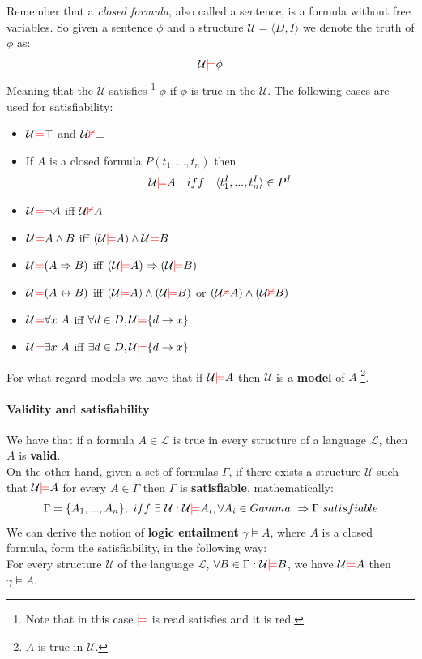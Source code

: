 \documentclass[10pt,a4paper]{article}
\begin{document}
Remember that a \textit{closed formula}, also called a sentence, is a formula without free variables. So given a sentence $\phi$ and a structure $\mathcal{U}=\langle D, I \rangle$ we denote the truth of $\phi$ as:
\[\mathcal{U} \textcolor{red}{\models} \phi\]
Meaning that the $\mathcal{U}$ satisfies \footnote{Note that in this case $\textcolor{red}{\models}$ is read satisfies and it is red.} $\phi$ if $\phi$ is true in the $\mathcal{U}$. The following cases are used for satisfiability:
\begin{itemize}
\item $\mathcal{U}\textcolor{red}{\models} \top$ and $\mathcal{U} \textcolor{red}{\nvDash} \bot$
\item If $A$ is a closed formula $P(t_1,...,t_n)$ then
\[\mathcal{U} \textcolor{red}{\models} A\quad iff\quad \langle t_1^I,...,t_n^I\rangle \in P^I\]
\item $\mathcal{U} \textcolor{red}{\models} \neg A$ iff $\mathcal{U} \textcolor{red}{\nvDash} A$
\item $\mathcal{U} \textcolor{red}{\models} A \wedge B$ iff $(\mathcal{U} \textcolor{red}{\models} A)\wedge \mathcal{U} \textcolor{red}{\models} B$
\item $\mathcal{U} \textcolor{red}{\models} (A \Rightarrow B)$ iff $(\mathcal{U} \textcolor{red}{\models} A)\Rightarrow (\mathcal{U} \textcolor{red}{\models} B)$
\item $\mathcal{U} \textcolor{red}{\models} (A \leftrightarrow B)$ iff $(\mathcal{U} \textcolor{red}{\models} A)\wedge (\mathcal{U} \textcolor{red}{\models} B)$ or $(\mathcal{U} \textcolor{red}{\nvDash} A)\wedge (\mathcal{U} \textcolor{red}{\nvDash} B)$
\item $\mathcal{U} \satisfy \forall x\ A$ iff $\forall d \in D, \mathcal{U}\textcolor{red}{\models} \lbrace d \rightarrow x\rbrace$
\item $\mathcal{U} \satisfy \exists x\ A$ iff $\exists d \in D, \mathcal{U}\textcolor{red}{\models} \lbrace d \rightarrow x\rbrace$
\end{itemize}

For what regard models we have that if $\mathcal{U} \textcolor{red}{\models} A$ then $\mathcal{U}$ is a \textbf{model} of $A$ \footnote{$A$ is true in $\mathcal{U}$.}.

\paragraph{Validity and satisfiability}

We have that if a formula $A\in \mathcal{L}$ is true in every structure of a language $\mathcal{L}$, then $A$ is \textbf{valid}.\\
On the other hand, given a set of formulas $\Gamma$, if there exists a structure $\mathcal{U}$ such that $\mathcal{U} \textcolor{red}{\models} A$ for every $A \in \Gamma$ then $\Gamma$ is \textbf{satisfiable}, mathematically:
\[\Gamma = \lbrace A_1,...,A_n \rbrace,\ iff\ \exists\ \mathcal{U} :\mathcal{U}\satisfy A_i, \forall A_i \in Gamma\ \Rightarrow \Gamma\ satisfiable\]
We can derive the notion of \textbf{logic entailment} $\gamma \models A$, where $A$ is a closed formula, form the satisfiability, in the following way:\\
For every structure $\mathcal{U}$ of the language $\mathcal{L}$, $\forall B\in \Gamma:\mathcal{U} \textcolor{red}{\models} B$, we have $\mathcal{U} \textcolor{red}{\models} A$ then  $\gamma \models A$.
\end{document}
